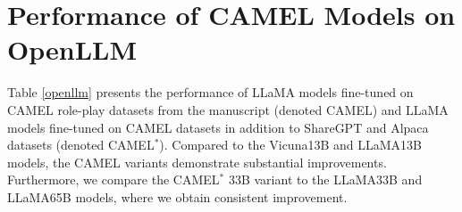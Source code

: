 \begin{table}[htbp]
\centering
\caption{\textbf{FlanT5 Emergence of Knowledge.} Upon being fine-tuned on AI Society data, FlanT5 experiences a significant emergence of knowledge on AI Society related tasks.}
\label{flant5}
\end{table}


\section{Performance of CAMEL Models on OpenLLM}

Table \ref{openllm} presents the performance of LLaMA models fine-tuned on CAMEL role-play datasets from the manuscript (denoted CAMEL) and LLaMA models fine-tuned on CAMEL datasets in addition to ShareGPT and Alpaca datasets (denoted CAMEL$^*$). Compared to the Vicuna13B and LLaMA13B models, the CAMEL variants demonstrate substantial improvements. Furthermore, we compare the CAMEL$^*$ 33B variant to the LLaMA33B and LLaMA65B models, where we obtain consistent improvement.


